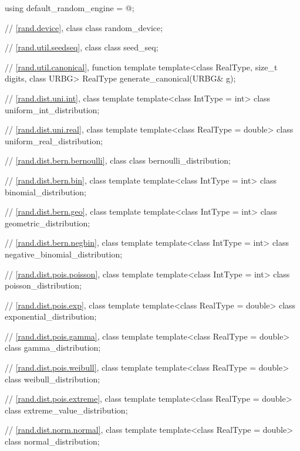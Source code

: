 \begin{codeblock}
{  using default_random_engine = @\seebelow@;

  // \ref{rand.device}, class 
  class random_device;

  // \ref{rand.util.seedseq}, class 
  class seed_seq;

  // \ref{rand.util.canonical}, function template 
  template<class RealType, size_t digits, class URBG>
    RealType generate_canonical(URBG& g);

  // \ref{rand.dist.uni.int}, class template 
  template<class IntType = int>
    class uniform_int_distribution;

  // \ref{rand.dist.uni.real}, class template 
  template<class RealType = double>
    class uniform_real_distribution;

  // \ref{rand.dist.bern.bernoulli}, class 
  class bernoulli_distribution;

  // \ref{rand.dist.bern.bin}, class template 
  template<class IntType = int>
    class binomial_distribution;

  // \ref{rand.dist.bern.geo}, class template 
  template<class IntType = int>
    class geometric_distribution;

  // \ref{rand.dist.bern.negbin}, class template 
  template<class IntType = int>
    class negative_binomial_distribution;

  // \ref{rand.dist.pois.poisson}, class template 
  template<class IntType = int>
    class poisson_distribution;

  // \ref{rand.dist.pois.exp}, class template 
  template<class RealType = double>
    class exponential_distribution;

  // \ref{rand.dist.pois.gamma}, class template 
  template<class RealType = double>
    class gamma_distribution;

  // \ref{rand.dist.pois.weibull}, class template 
  template<class RealType = double>
    class weibull_distribution;

  // \ref{rand.dist.pois.extreme}, class template 
  template<class RealType = double>
    class extreme_value_distribution;

  // \ref{rand.dist.norm.normal}, class template 
  template<class RealType = double>
    class normal_distribution;

}
\end{codeblock}
